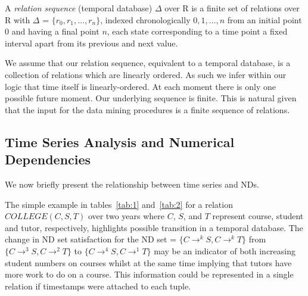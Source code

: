 \begin{definition}
\begin{rm}
A {\em relation sequence} (temporal database) $\Delta$ over R is a
finite set of 
relations over R with $\Delta$ = $\{ r_0, r_1, \ldots, r_n \}$,
indexed chronologically $0, 1, \ldots, n$ from an initial point 0 and
having a final point $n$, each state corresponding to a time point a
fixed interval apart from its previous and next value.
\end{rm}
\end{definition}

We assume that our relation sequence, equivalent to a temporal
database, is a collection of
relations which are linearly ordered. As such we infer within our
logic that time itself is linearly-ordered. At each moment there is
only one possible future moment. 
Our underlying sequence is finite. This is natural given that the
input for the
data mining procedures is a finite sequence of relations.


\subsection{Time Series Analysis and Numerical
Dependencies}\label{subsec:tl_tsa_nd}

We now briefly present the relationship between time series and NDs.

\smallskip

The simple example in tables~\ref{tab:1} and~\ref{tab:2} for
a relation $COLLEGE(C,S,T)$ over two years where $C$, $S$, and $T$
represent course, student and tutor, respectively, highlights possible
transition in a temporal database. The change in ND set satisfaction
for the ND set = $\{ C \to^k S, C \to^k T \}$ from $\{ C \to^3 S, C \to^2 T \}$
to $\{ C \to^4 S, C \to^1 T \}$ may be an indicator of both increasing
student numbers on courses whilst at the same time implying that
tutors have more work to do on a course. This information could be
represented in a single relation if timestamps were attached to each
tuple.

